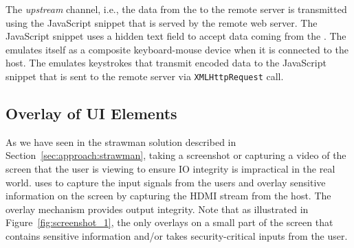 The \emph{upstream} channel, i.e., the data from the \device to the remote server is transmitted using the \name JavaScript snippet that is served by the remote web server. The \name JavaScript snippet uses a hidden text field to accept data coming from the \device. The \device emulates itself as a composite keyboard-mouse device when it is connected to the host. The \device emulates keystrokes that transmit encoded data to the \name JavaScript snippet that is sent to the remote server via \texttt{XMLHttpRequest} call.
\fi





\subsection{\device Overlay of UI Elements}
\label{sec:systemDesign:transformation}

As we have seen in the strawman solution described in Section~\ref{sec:approach:strawman}, taking a screenshot or capturing a video of the screen that the user is viewing to ensure IO integrity is impractical in the real world. \name uses \device to capture the input signals from the users and overlay sensitive information on the screen by capturing the HDMI stream from the host. The overlay mechanism provides output integrity. Note that as illustrated in Figure~\ref{fig:screenshot_1}, the \device only overlays on a small part of the screen that contains sensitive information and/or takes security-critical inputs from the user.

